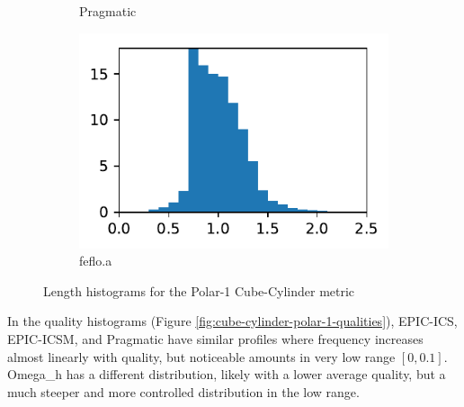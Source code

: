 \documentclass[3p,times,procedia,number]{elsarticle}
\begin{document}
\begin{figure}
\begin{subfigure}{.16\textwidth}
\caption{Pragmatic}
\end{subfigure}
\begin{subfigure}{.16\textwidth}
\centering
\includegraphics[width=\textwidth]{fefloa-cube-cylinder-polar-1-length.pdf}
\caption{feflo.a}
\end{subfigure}
\caption{Length histograms for the Polar-1 Cube-Cylinder metric}
\label{fig:cube-cylinder-polar-1-lengths}
\end{figure}
In the quality histograms (Figure \ref{fig:cube-cylinder-polar-1-qualities}),
EPIC-ICS, EPIC-ICSM, and Pragmatic have similar
profiles where frequency increases almost linearly with quality, but noticeable
amounts in very low range $[0,0.1]$.
Omega\_h has a different distribution, likely with a lower average quality,
but a much steeper and more controlled distribution in the low range.
\end{document}
